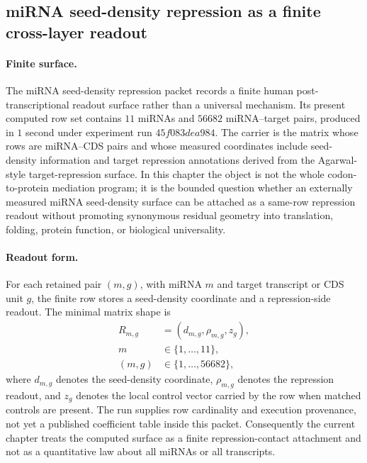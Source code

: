 \subsection{miRNA seed-density repression as a finite cross-layer readout}
\label{subsec:bioreality-mirna-seed-density-repression-agarwal2015}

\paragraph{Finite surface.}
The miRNA seed-density repression packet records a finite human post-transcriptional readout surface rather than a universal mechanism.  Its present computed row set contains $11$ miRNAs and $56682$ miRNA--target pairs, produced in $1$ second under experiment run $45f083dea984$.  The carrier is the matrix whose rows are miRNA--CDS pairs and whose measured coordinates include seed-density information and target repression annotations derived from the Agarwal-style target-repression surface.  In this chapter the object is not the whole codon-to-protein mediation program; it is the bounded question whether an externally measured miRNA seed-density surface can be attached as a same-row repression readout without promoting synonymous residual geometry into translation, folding, protein function, or biological universality.

\paragraph{Readout form.}
For each retained pair $(m,g)$, with miRNA $m$ and target transcript or CDS unit $g$, the finite row stores a seed-density coordinate and a repression-side readout.  The minimal matrix shape is
$$
\begin{aligned}
  R_{m,g} &= (d_{m,g},\rho_{m,g},z_g),\\
  m &\in \{1,\ldots,11\},\\
  (m,g) &\in \{1,\ldots,56682\},
\end{aligned}
$$
where $d_{m,g}$ denotes the seed-density coordinate, $\rho_{m,g}$ denotes the repression readout, and $z_g$ denotes the local control vector carried by the row when matched controls are present.  The run supplies row cardinality and execution provenance, not yet a published coefficient table inside this packet.  Consequently the current chapter treats the computed surface as a finite repression-contact attachment and not as a quantitative law about all miRNAs or all transcripts.

